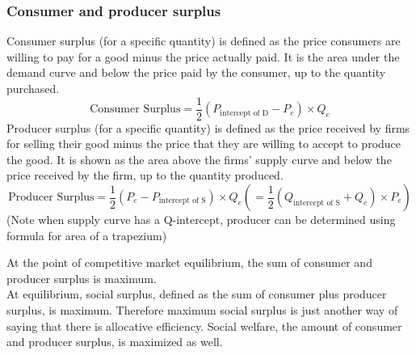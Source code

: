 \documentclass[a4paper,12pt]{article}
\begin{document}
\subsubsection*{Consumer and producer surplus}
Consumer surplus (for a specific quantity) is defined as the price consumers are willing to pay for a good minus the price actually paid. It is the area under the demand curve and below the price paid by the consumer, up to the quantity purchased.
\[\text{Consumer Surplus}=\dfrac{1}{2}(P_\text{intercept of D}-P_e)\times Q_e\]
Producer surplus (for a specific quantity) is defined as the price received by firms for selling their good minus the price that they are willing to accept to produce the good. It is shown as the area above the firms' supply curve and below the price received by the firm, up to the quantity produced.
\[\text{Producer Surplus}=\dfrac{1}{2}(P_e-P_\text{intercept of S})\times Q_e\left(=\dfrac{1}{2}(Q_\text{intercept of S}+Q_e)\times P_e\right)\]
(Note when supply curve has a Q-intercept, producer can be determined using formula for area of a trapezium)

\begin{center}
\end{center}
At the point of competitive market equilibrium, the sum of consumer and producer surplus is maximum.\\
At equilibrium, social surplus, defined as the sum of consumer plus producer surplus, is maximum. Therefore maximum social surplus is just another way of saying that there is allocative efficiency.
Social welfare, the amount of consumer and producer surplus, is maximized as well.
\end{document}
